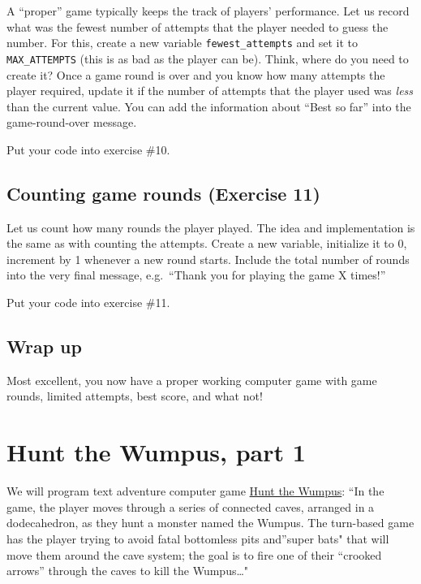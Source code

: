 \documentclass[
]{book}
\begin{document}
A ``proper'' game typically keeps the track of players' performance. Let us record what was the fewest number of attempts that the player needed to guess the number. For this, create a new variable \texttt{fewest\_attempts} and set it to \texttt{MAX\_ATTEMPTS} (this is as bad as the player can be). Think, where do you need to create it? Once a game round is over and you know how many attempts the player required, update it if the number of attempts that the player used was \emph{less} than the current value. You can add the information about ``Best so far'' into the game-round-over message.

Put your code into exercise \#10.

\hypertarget{counting-game-rounds-exercise-11}{%
\section{Counting game rounds (Exercise 11)}\label{counting-game-rounds-exercise-11}}

Let us count how many rounds the player played. The idea and implementation is the same as with counting the attempts. Create a new variable, initialize it to 0, increment by 1 whenever a new round starts. Include the total number of rounds into the very final message, e.g.~``Thank you for playing the game X times!''

Put your code into exercise \#11.

\hypertarget{wrap-up}{%
\section{Wrap up}\label{wrap-up}}

Most excellent, you now have a proper working computer game with game rounds, limited attempts, best score, and what not!

\hypertarget{seminar04}{%
\chapter{Hunt the Wumpus, part 1}\label{seminar04}}

We will program text adventure computer game \href{https://en.wikipedia.org/wiki/Hunt_the_Wumpus}{Hunt the Wumpus}: ``In the game, the player moves through a series of connected caves, arranged in a dodecahedron, as they hunt a monster named the Wumpus. The turn-based game has the player trying to avoid fatal bottomless pits and''super bats" that will move them around the cave system; the goal is to fire one of their ``crooked arrows'' through the caves to kill the Wumpus\ldots"
\end{document}
